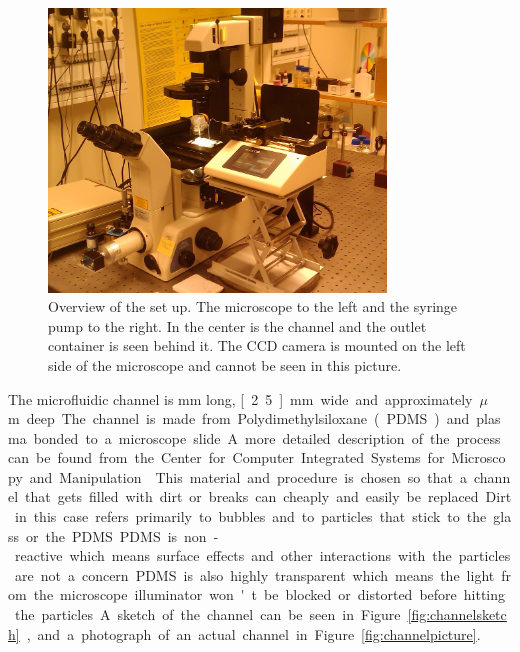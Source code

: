 \begin{figure}[H]
\centering
\includegraphics[width=0.8\textwidth]{figures/method/ExperimentalOverview.jpg}
\caption{Overview of the set up. The microscope to the left and the syringe pump to the right. In the center is the channel and the outlet container is seen behind it. The CCD camera is mounted on the left side of the microscope and cannot be seen in this picture.}\label{fig:setuppicture}
\end{figure}


The microfluidic channel is \unit[40]{mm} long, \unit[2.5]{mm} wide and approximately \unit[150]{$\mu$m} deep. The channel is made from Polydimethylsiloxane (PDMS) and plasma bonded to a microscope slide. A more detailed description of the process can be found from the Center for Computer Integrated Systems for Microscopy and Manipulation~\cite{PDMS}. This material and procedure is chosen so that a channel that gets filled with dirt or breaks can cheaply and easily be replaced. Dirt in this case refers primarily to bubbles and to particles that stick to the glass or the PDMS. PDMS is non-reactive which means surface effects and other interactions with the particles are not a concern. PDMS is also highly transparent which means the light from the microscope illuminator won't be blocked or distorted before hitting the particles. A sketch of the channel can be seen in Figure \ref{fig:channelsketch}, and a photograph of an actual channel in Figure \ref{fig:channelpicture}.

